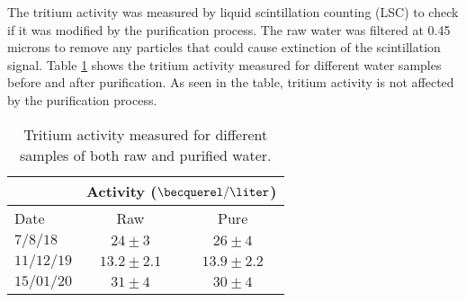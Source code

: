 The tritium activity was measured by liquid scintillation counting (LSC) to check if it was modified by the purification process. The raw water was filtered at 0.45 microns to remove any particles that could cause extinction of the scintillation signal. Table \ref{tab:ActivityTritiumValues} shows the tritium activity measured for different water samples before and after purification. As seen in the table, tritium activity is not affected by the purification process.

\begin{table}[htbp]
\centering{}%
\begin{tabular}{lcc}
\toprule 
& \multicolumn{2}{c}{Activity ($\becquerel/\liter$)} \tabularnewline
\midrule
Date & Raw & Pure \tabularnewline
\midrule
\midrule 
$7/8/18$ & $24 \pm 3$ & $26 \pm 4$ \tabularnewline
$11/12/19$ & $13.2 \pm 2.1$ & $13.9 \pm 2.2$ \tabularnewline
$15/01/20$ & $31 \pm 4$ & $30 \pm 4$ \tabularnewline
\bottomrule
\end{tabular}
\caption{Tritium activity measured for different samples of both raw and purified water.}
\label{tab:ActivityTritiumValues}
\end{table}


